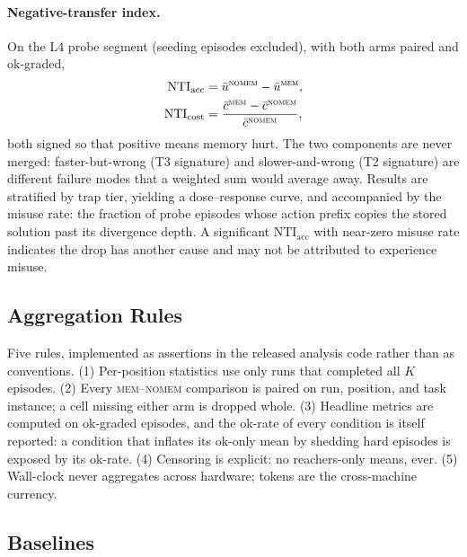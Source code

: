 \documentclass[11pt]{article}
\begin{document}
\paragraph{Negative-transfer index.} On the L4 probe segment (seeding
episodes excluded), with both arms paired and ok-graded,
\begin{align}
\mathrm{NTI}_{\mathrm{acc}}&=\bar u^{\textsc{nomem}}-\bar u^{\textsc{mem}},
\label{eq:nti-acc}\\
\mathrm{NTI}_{\mathrm{cost}}&=
\frac{\bar c^{\textsc{mem}}-\bar c^{\textsc{nomem}}}{\bar c^{\textsc{nomem}}},
\label{eq:nti-cost}
\end{align}
both signed so that positive means memory hurt. The two components are never
merged: faster-but-wrong (T3 signature) and slower-and-wrong (T2 signature)
are different failure modes that a weighted sum would average away. Results
are stratified by trap tier, yielding a dose--response curve, and accompanied
by the misuse rate: the fraction of probe episodes whose action prefix copies
the stored solution past its divergence depth. A significant
$\mathrm{NTI}_{\mathrm{acc}}$ with near-zero misuse rate indicates the drop
has another cause and may not be attributed to experience misuse.

\subsection{Aggregation Rules}
\label{sec:rules}

Five rules, implemented as assertions in the released analysis code rather
than as conventions. (1) Per-position statistics use only runs that completed
all $K$ episodes. (2) Every \textsc{mem}--\textsc{nomem} comparison is paired
on run, position, and task instance; a cell missing either arm is dropped
whole. (3) Headline metrics are computed on ok-graded episodes, and the
ok-rate of every condition is itself reported: a condition that inflates its
ok-only mean by shedding hard episodes is exposed by its ok-rate. (4)
Censoring is explicit: no reachers-only means, ever. (5) Wall-clock never
aggregates across hardware; tokens are the cross-machine currency.

\subsection{Baselines}
\label{sec:baselines}
\end{document}
